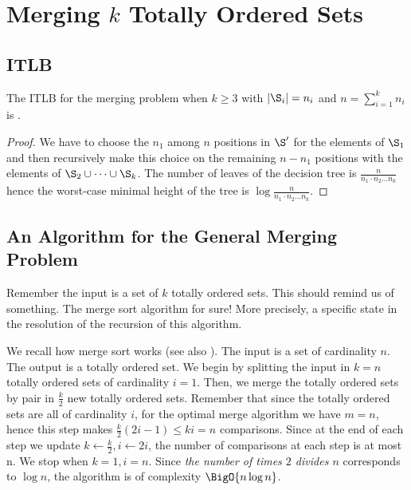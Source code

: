\section{Merging $k$ Totally Ordered Sets}
\label{tree:merging:kgeq3}


\subsection*{ITLB}
\label{tree:merging:kgeq3:ITLB}


\begin{theorem}
The ITLB for the merging problem when $k \geq 3$ with $|\S_i| = n_i$ and $n =
\sum_{i=1}^{k} n_i$ is .
\end{theorem}

\begin{proof}
We have to choose the $n_1$ among $n$ positions in $\S'$ for the elements of
$\S_1$ and then recursively make this choice on the remaining $n - n_1$
positions with the elements of \(\S_2 \cup \dots \cup \S_k\). The number of
leaves of the decision tree is $\frac{n}{n_1 \cdot n_2 \dots n_k}$ hence the
worst-case minimal height of the tree is $\log \frac{n}{n_1 \cdot n_2 \dots
n_k}$.
\end{proof}


\subsection*{An Algorithm for the General Merging Problem}
\label{tree:merging:kgeq3:alg}

Remember the input is a set of $k$ totally ordered sets. This should remind us
of something. The merge sort algorithm for sure! More precisely, a specific
state in the resolution of the recursion of this algorithm.

We recall how merge sort works (see also \citet*{leiserson2001introduction}). The input is a
set of cardinality $n$. The output is a totally ordered set. We begin by
splitting the input in $k = n$ totally ordered sets of cardinality $i = 1$.
Then, we merge the totally ordered sets by pair in $\frac{k}{2}$ new totally
ordered sets. Remember that since the totally ordered sets are all of
cardinality $i$, for the optimal merge algorithm we have $m=n$, hence this step makes
$\frac{k}{2} (2 i - 1) \le k i = n$ comparisons. Since at the end of each step we
update $k \gets \frac{k}{2}, i \gets 2i$, the number of comparisons at each
step is at most n. We stop when $k = 1, i = n$.
Since \emph{the number of times $2$ divides $n$} corresponds to $\log n$, the
algorithm is of complexity $\BigO{n \log n}$.

